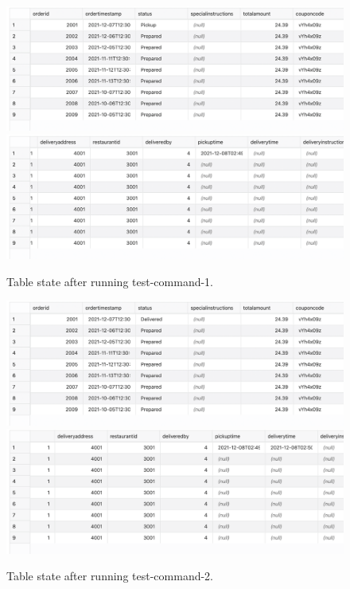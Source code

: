 \documentclass[12pt,letterpaper]{article}
\begin{document}
\begin{enumerate}
\begin{figure}[H]
    \includegraphics[width=\textwidth]{figures/Picture25.png}\hfill
    \includegraphics[width=\textwidth]{figures/Picture26.png}\hfill
    \\[\smallskipamount]
    \caption{Table state after running test-command-1.}\label{fig:trig22}
\end{figure}

\begin{figure}[H]
    \includegraphics[width=\textwidth]{figures/Picture23.png}\hfill
    \includegraphics[width=\textwidth]{figures/Picture24.png}\hfill
    \\[\smallskipamount]
    \caption{Table state after running test-command-2.}\label{fig:trig22}
\end{figure}
\end{enumerate}
\end{document}
